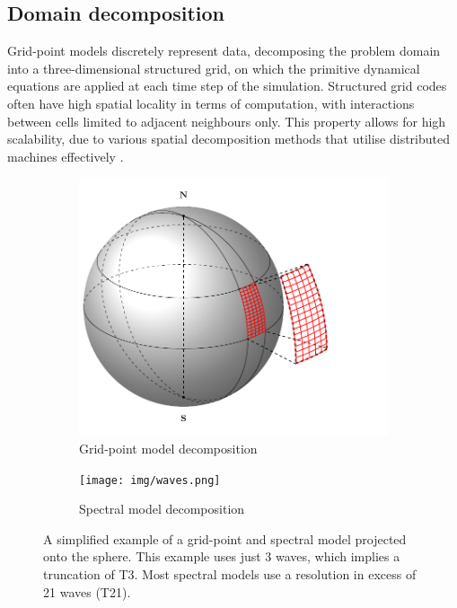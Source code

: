\documentclass[a4paper,11pt]{report}
\begin{document}
\subsection{Domain decomposition}
\label{sec:spectral-domain}
Grid-point models discretely represent data,  decomposing the problem domain into a three-dimensional structured grid, on which the primitive dynamical equations are applied at each time step of the simulation. Structured grid codes often have high spatial locality in terms of computation, with interactions between cells limited to adjacent neighbours only. This property allows for high scalability, due to various spatial decomposition methods that utilise distributed machines effectively \cite{mcintosh2014performance}. 
\begin{figure}[htbp]
\centering
\begin{subfigure}{.5\textwidth}
  \centering
  \includegraphics[width=.99\linewidth]{img/sphere-decomp.pdf}
  \caption{Grid-point model decomposition}
  \label{fig:sub1}
\end{subfigure}%
\begin{subfigure}{.5\textwidth}
  \centering
  \texttt{[image: img/waves.png]}
  \caption{Spectral model decomposition}
  \label{fig:sub2}
\end{subfigure}
\caption[Grid-point and spectral domain decomposition]{A simplified example of a grid-point and spectral model projected onto the sphere. This example uses just 3 waves, which implies a truncation of T3. Most spectral models use a resolution in excess of 21 waves (T21). }
\label{fig:test}
\end{figure}
\end{document}
